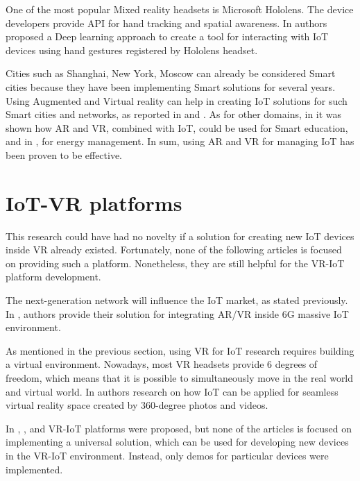 One of the most popular Mixed reality headsets is Microsoft Hololens. The device developers provide API for hand tracking and spatial awareness. In \cite{sun_magichand_2019} authors proposed a Deep learning approach to create a tool for interacting with IoT devices using hand gestures registered by Hololens headset. 

Cities such as Shanghai, New York, Moscow can already be considered Smart cities because they have been implementing Smart solutions for several years. Using Augmented and Virtual reality can help in creating IoT solutions for such Smart cities and networks, as reported in \cite{chakareski_uav-iot_2019} and \cite{carneiro_bim_2018}. As for other domains, in \cite{paul_role_2019} it was shown how AR and VR, combined with IoT, could be used for Smart education, and in \cite{jang_building_2019-1}, for energy management. In sum, using AR and VR for managing IoT has been proven to be effective.

\section{IoT-VR platforms}

This research could have had no novelty if a solution for creating new IoT devices inside VR already existed. Fortunately, none of the following articles is focused on providing such a platform. Nonetheless, they are still helpful for the VR-IoT platform development.

The next-generation network will influence the IoT market, as stated previously. In \cite{liao_information-centric_2021}, authors provide their solution for integrating AR/VR inside 6G massive IoT environment.

As mentioned in the previous section, using VR for IoT research requires building a virtual environment. Nowadays, most VR headsets provide 6 degrees of freedom, which means that it is possible to simultaneously move in the real world and virtual world. In \cite{you_internet_2018} authors research on how IoT can be applied for seamless virtual reality space created by 360-degree photos and videos.

In \cite{myeong-in_choi_design_2017}, \cite{simiscuka_synchronisation_2018}, \cite{simiscuka_real-virtual_2019} and \cite{krishnan_performance_2020} VR-IoT platforms were proposed, but none of the articles is focused on implementing a universal solution, which can be used for developing new devices in the VR-IoT environment. Instead, only demos for particular devices were implemented.

